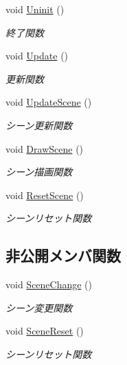 \begin{DoxyCompactItemize}
void \mbox{\hyperlink{class_scene_manager_ae3ff21f2261fc50f1e860cf7fc3a2108}{Uninit}} ()
\begin{DoxyCompactList}\small\item\em 終了関数 \end{DoxyCompactList}\item 
void \mbox{\hyperlink{class_scene_manager_a63dcf65832d6a2c190bf496d9a3b00a3}{Update}} ()
\begin{DoxyCompactList}\small\item\em 更新関数 \end{DoxyCompactList}\item 
void \mbox{\hyperlink{class_scene_manager_a493bc0d65558ce004f6f248a185ba956}{Update\+Scene}} ()
\begin{DoxyCompactList}\small\item\em シーン更新関数 \end{DoxyCompactList}\item 
void \mbox{\hyperlink{class_scene_manager_a828b35826f757b8af34aa767c6b40378}{Draw\+Scene}} ()
\begin{DoxyCompactList}\small\item\em シーン描画関数 \end{DoxyCompactList}\item 
void \mbox{\hyperlink{class_scene_manager_a1759161a38025ec8212dc98439fd7335}{Reset\+Scene}} ()
\begin{DoxyCompactList}\small\item\em シーンリセット関数 \end{DoxyCompactList}\end{DoxyCompactItemize}
\subsection*{非公開メンバ関数}
\begin{DoxyCompactItemize}
\item 
void \mbox{\hyperlink{class_scene_manager_ab1ffc5d84cf812e4105cba755d034770}{Scene\+Change}} ()
\begin{DoxyCompactList}\small\item\em シーン変更関数 \end{DoxyCompactList}\item 
void \mbox{\hyperlink{class_scene_manager_a0652a81c7baff52add9ec4b13205865c}{Scene\+Reset}} ()
\begin{DoxyCompactList}\small\item\em シーンリセット関数 \end{DoxyCompactList}\end{DoxyCompactItemize}
